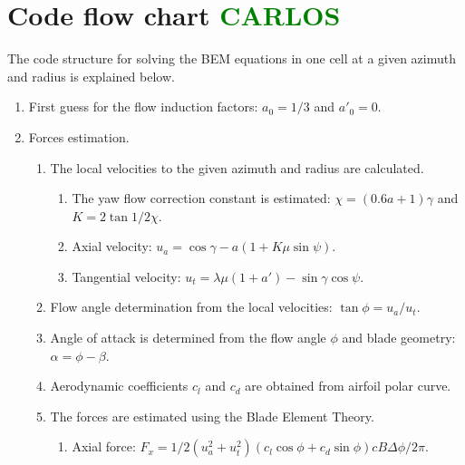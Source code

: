\section{Code flow chart \textcolor{green}{CARLOS}}

The code structure for solving the BEM equations in one cell at a given azimuth and radius is explained below.

\begin{enumerate}
	
	\item First guess for the flow induction factors: $ a_0 = 1/3 $ and $ a'_0 = 0 $.
	
	\item \label{iteration-start} Forces estimation.
	
	\begin{enumerate}
		
		\item The local velocities to the given azimuth and radius are calculated.
		
		\begin{enumerate}
			
			\item The yaw flow correction constant is estimated: $ \chi = (0.6 a + 1) \gamma $ and $ K = 2 \tan 1/2 \chi $.
			
			\item Axial velocity: $ u_a = \cos \gamma - a (1 + K \mu \sin \psi) $.
			
			\item Tangential velocity: $ u_t = \lambda \mu (1+a') - \sin \gamma \cos \psi $.
			
		\end{enumerate}
		
		\item Flow angle determination from the local velocities: $ \tan \phi = u_a/u_t $.
		
		\item Angle of attack is determined from the flow angle $ \phi $ and blade geometry: $ \alpha = \phi - \beta $.
		
		\item Aerodynamic coefficients $ c_l $ and $ c_d $ are obtained from airfoil polar curve.
		
		\item The forces are estimated using the Blade Element Theory.
		
		\begin{enumerate}
			
			\item Axial force: $ F_x = 1/2 (u_a^2+u_t^2) (c_l \cos \phi + c_d \sin \phi) c B \Delta \phi / 2 \pi $.
			

\end{enumerate}
\end{enumerate}
\end{enumerate}
